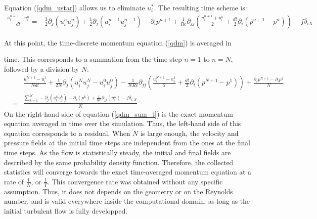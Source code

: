 \documentclass[aip,pof,reprint]{revtex4-1}
\begin{document}
\begin{widetext}
{\color{red} Equation (\ref{qdm_ustar}) allows us to eliminate $u_i^*$.}
The resulting time scheme is:
\begin{eqnarray}
\label{qdm}
\frac{u_i^{n+1}-u_i^n}{dt}
=
- \frac{3}{2} \partial_j \left( u_i^n u_j^n \right)
+ \frac{1}{2} \partial_j \left( u_i^{n-1} u_j^{n-1} \right)
- \partial_i p^{n+1} %
+ \frac{1}{Re} \partial_{jj} \left( \frac{u_i^{n+1} + u_i^n}{2} + \frac{dt}{2} \partial_i \left( p^{n+1}-p^{n} \right) \right)
- f \delta_{iX}
\end{eqnarray}

At this point, the time-discrete momentum equation (\ref{qdm}) is averaged in {\color{red} time.
This corresponds to a summation from the time step $n=1$ to $n=N$, followed by a division by $N$:
\begin{eqnarray}
\label{qdm_sum_t}
&&
\frac{u_i^{N+1}-u_i^1}{Ndt}
+ \frac{1}{2N} \partial_j \left( u_i^{N} u_j^{N} - u_i^0 u_j^0 \right)
- \frac{1}{NRe} \partial_{jj} \left( \frac{u_i^{N+1} - u_i^1}{2} + \frac{dt}{2} \partial_i \left( p^{N+1} - p^1 \right) \right)
+ \frac{\partial_i p^{N+1} - \partial_i p^1}{N}
\nonumber \\
& = &
\frac{ \sum_{k=1}^N
- \partial_j \left( u_i^k u_j^k \right)
- \partial_i \left( p^k \right)
+ \frac{1}{Re} \partial_{jj} \left( u_i^k \right)
- f \delta_{i,X}}{N}
\end{eqnarray}
On the right-hand side of equation (\ref{qdm_sum_t}) is the exact momentum equation averaged in time over the simulation.
Thus, the left-hand side of this equation corresponds to a residual.
When $N$ is large enough, the velocity and pressure fields at the initial time steps are independent from the ones at the final time steps.
As the flow is statistically steady, the initial and final fields are described by the same probability density function.
Therefore, the collected statistics will converge towards the exact time-averaged momentum equation at a rate of $\frac{1}{N}$, or $\frac{1}{T}$.
This convergence rate was obtained without any specific assumption.
Thus, it does not depends on the geometry or on the Reynolds number, and is valid everywhere inside the computational domain, as long as the initial turbulent flow is fully developped.

}
\end{widetext}
\end{document}
